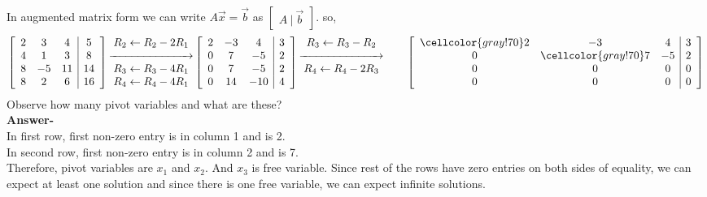 \documentclass{article}
\newcommand\bg{\cellcolor{gray!70}}
\begin{document}
In augmented matrix form we can write $A\vec{x} = \vec{b}$ as $\begin{bmatrix}
    A~|~\vec{b}
\end{bmatrix}$. so,\\
\[
 \left[\begin{array}{ccc|c}
     2 &3 &4 &5\\
     4 &1 &3 &8\\
     8 &-5 &11 &14\\
     8 &2 &6 &16\\
  \end{array}\right]
  \begin{matrix}
    R_2\leftarrow R_2 - 2R_1\\
    \xrightarrow{\hspace*{2.5cm}}\\
    R_3\leftarrow R_3 - 4R_1\\
    R_4\leftarrow R_4 - 4R_1\\
  \end{matrix}
  \left[\begin{array}{ccc|c}
     2 &-3 &4 &3\\
     0 &7 &-5 &2\\
     0 &7 &-5 &2\\
     0 &14 &-10 &4\\
  \end{array}\right]
  \begin{matrix}
    R_3\leftarrow R_3 - R_2\\
    \xrightarrow{\hspace*{2.5cm}}\\
    R_4\leftarrow R_4 - 2R_3\\
    &&\\
  \end{matrix}
  \left[\begin{array}{ccc|c}
    \bg2 &-3 &4 &3\\
     0 &\bg7 &-5 &2\\
     0 &0 &0 &0\\
     0 &0 &0 &0\\
  \end{array}\right]
\]
Observe how many pivot variables and what are these?\\
\textbf{Answer-}\\In first row, first non-zero entry is in column 1 and is 2.\\
In second row, first non-zero entry is in column 2 and is 7.\\
Therefore, pivot variables are $x_1$ and $x_2$. And $x_3$ is free variable. Since rest of the rows have zero entries on both sides of equality, we can expect at least one solution and since there is one free variable, we can expect infinite solutions.\\
\end{document}
